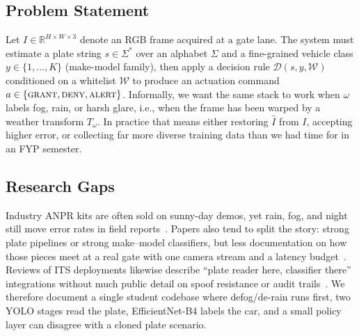 \documentclass[10pt, conference]{IEEEtran}
\begin{document}
\subsection{Problem Statement}
Let $I \in \mathbb{R}^{H\times W \times 3}$ denote an RGB frame acquired at a gate lane. The system must estimate a plate string $s \in \Sigma^\ast$ over an alphabet $\Sigma$ and a fine-grained vehicle class $y \in \{1,\ldots,K\}$ (make-model family), then apply a decision rule $\mathcal{D}(s,y,\mathcal{W})$ conditioned on a whitelist $\mathcal{W}$ to produce an actuation command $a \in \{\textsc{grant},\textsc{deny},\textsc{alert}\}$. Informally, we want the same stack to work when $\omega$ labels fog, rain, or harsh glare, i.e., when the frame has been warped by a weather transform $T_\omega$. In practice that means either restoring $\hat{I}$ from $I$, accepting higher error, or collecting far more diverse training data than we had time for in an FYP semester.

\subsection{Research Gaps}
Industry ANPR kits are often sold on sunny-day demos, yet rain, fog, and night still move error rates in field reports~\cite{r05,r15}. Papers also tend to split the story: strong plate pipelines or strong make--model classifiers, but less documentation on how those pieces meet at a real gate with one camera stream and a latency budget~\cite{r08,r18}. Reviews of ITS deployments likewise describe ``plate reader here, classifier there'' integrations without much public detail on spoof resistance or audit trails~\cite{r01,r09}. We therefore document a single student codebase where defog/de-rain runs first, two YOLO stages read the plate, EfficientNet-B4 labels the car, and a small policy layer can disagree with a cloned plate scenario.
\end{document}
